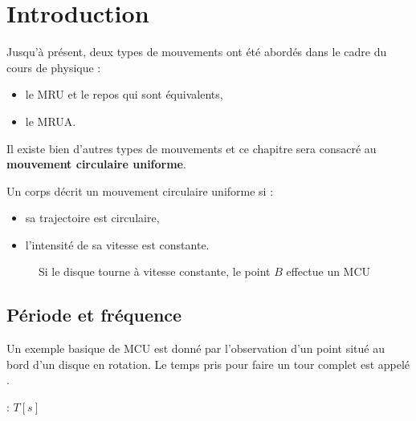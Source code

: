 \chapter{Introduction}
Jusqu'à présent, deux types de mouvements ont été abordés dans le cadre du cours de physique :
\begin{itemize}
      \item le MRU et le repos qui sont équivalents,
      \item le MRUA.
\end{itemize}

Il existe bien d'autres types de mouvements et ce chapitre sera consacré au \textbf{mouvement circulaire uniforme}.

\begin{encadre}
      Un corps décrit un mouvement circulaire uniforme si :
      \begin{itemize}
            \item sa trajectoire est circulaire,
            \item l'intensité de sa vitesse est constante.
      \end{itemize}
\end{encadre}

\begin{figure}[h!]
      \centering

      \caption{Si le disque tourne à vitesse constante, le point \(B\) effectue un MCU}
\end{figure}

\newpage

\section{Période et fréquence}
Un exemple basique de MCU est donné par l'observation d'un point situé au bord d'un disque en rotation.
Le temps pris pour faire un tour complet est appelé .
\begin{encadre}
       : \(T [s]\)
\end{encadre}



